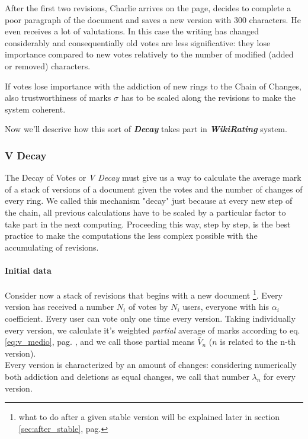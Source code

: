 \documentclass[a4paper,11pt]{article}
\newcommand{\wir}{\textbf{\textit{WikiRating }}}
\newcommand{\sg}{$\sigma$ }
\newcommand{\pb}[1]{$\bar{V}_#1$ }
\begin{document}
After the first two revisions, Charlie arrives on the page, decides to complete a poor 
paragraph of the document and saves a new version with 300 characters. He even receives a 
lot of valutations. In this case the writing has changed considerably and consequentially 
old votes are less significative: they lose importance compared to new votes relatively to 
the number of modified (added or removed) characters.

If votes lose importance with the addiction of new rings to the Chain of Changes, also 
trustworthiness of marks \sg has to be scaled along the revisions to make the system 
coherent. 

Now we'll descrive how this sort of \textit{\textbf{Decay}} takes part in \wir system.

\subsubsection{V Decay} \label{sec:v_decay}
The Decay of Votes or \emph{V Decay} must give us a way to calculate the average mark of a 
stack of versions of a document given the votes and the number of changes of every ring.
We called this mechanism "decay" just because at every new step of the chain, all previous 
calculations have to be scaled by a particular factor to take part in the next computing. 
Proceeding this way, step by step, is the best practice to make the computations the less 
complex possible with the accumulating of revisions.

\paragraph{Initial data} Consider now a stack of revisions that begins with a new document \footnote{what to do after a given stable version will be explained later in section \ref{sec:after_stable}, pag. \pageref{sec:after_stable}}. 
Every version has received a number $N_i$ of votes by $N_i$ users, everyone with his $
\alpha_i$ coefficient. Every user can vote only one time every version. Taking individually every version, we calculate it's weighted 
\emph{partial} average of marks according to eq. \ref{eq:v_medio}, pag. 
\pageref{eq:v_medio}, and we call those partial means \pb{n} ($n$ is related to the n-th version).\\
Every version is characterized by an amount of changes: considering numerically both 
addiction and deletions as equal changes, we call that number $\lambda_n$ for every 
version.
\end{document}

